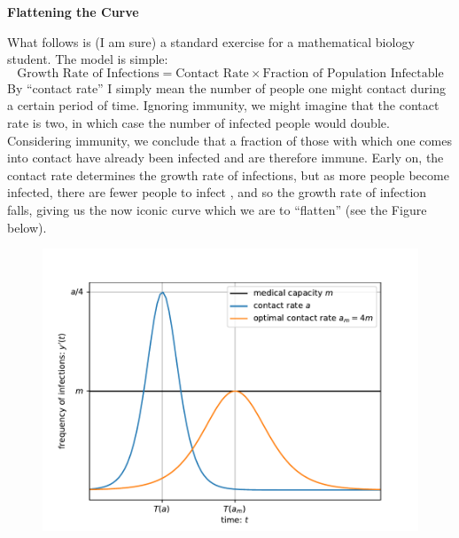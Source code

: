 \documentclass[12pt]{article}
\begin{document}
\onehalfspacing
\begin{center}
	\textbf{Flattening the Curve}
\end{center}
	What follows is (I am sure) a standard exercise for a mathematical biology student. The model is simple:
\begin{equation}
	\text{Growth Rate of Infections} = \text{Contact Rate}\times\text{Fraction of Population Infectable}
\end{equation}
By ``contact rate'' I simply mean the number of people one might contact during a certain period of time. Ignoring immunity, we might imagine that the contact rate is two, in which case the number of infected people would double. Considering immunity, we conclude that a fraction of those with which one comes into contact have already been infected and are therefore immune. Early on, the contact rate determines the growth rate of infections, but as more people become infected, there are fewer people to infect , and so the growth rate of infection falls, giving us the now iconic curve which we are to ``flatten'' (see the Figure below). 

\begin{figure}[H]
	\begin{center}
		\includegraphics{curve}
	\end{center}
\end{figure}
\end{document}
